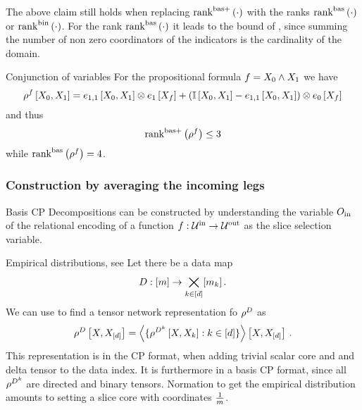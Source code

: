 The above claim still holds when replacing $\mathrm{rank}^{\mathrm{bas+}}\left(\cdot\right)$ with the ranks $\mathrm{rank}^{\mathrm{bas}}\left(\cdot\right)$ or $\mathrm{rank}^{\mathrm{bin}}\left(\cdot\right)$.
For the rank $\mathrm{rank}^{\mathrm{bas}}\left(\cdot\right)$ it leads to the bound of , since summing the number of non zero coordinators of the indicators is the cardinality of the domain.

\begin{example}{Conjunction of variables}
	For the propositional formula $f = X_{0} \land X_{1}$ we have
		\[ \rho^{f}\left[X_{0},X_{1}\right]
		 = e_{1,1}\left[X_{0},X_{1}\right] \otimes e_{1}\left[X_{f}\right]
		  +  (\mathbb{I}\left[X_{0},X_{1}\right] - e_{1,1}\left[X_{0},X_{1}\right]) \otimes e_{0}\left[X_{f}\right]  \]
	and thus 
		\[ \mathrm{rank}^{\mathrm{bas+}}\left(\rho^{f}\right) \leq 3\]
	while $\mathrm{rank}^{\mathrm{bas}}\left(\rho^{f}\right) = 4$.
\end{example}




\subsubsection{Construction by averaging the incoming legs}

Basis CP Decompositions can be constructed by understanding the variable $O_{\mathrm{in}}$ of the relational encoding of a function $f:\mathcal{U}^{\mathrm{in}} \rightarrow \mathcal{U}^{\mathrm{out}}$ as the slice selection variable.

\begin{example}{Empirical distributions, see }
	Let there be a data map 
		\[ D : [m] \rightarrow \bigtimes_{k\in[d]}[m_{k}] \, . \]
	We can use  to find a tensor network representation fo $\rho^{D}$ as
	\begin{align*}
		\rho^{D}\left[X,X_{[d]}\right]  
		= \left\langle 
		\{\rho^{D^{k}}\left[X,X_{k}\right] : k\in[d] \} 
		\right\rangle \left[ X,X_{[d]} \right] \, . 
	\end{align*}
	This representation is in the CP format, when adding trivial scalar core and and delta tensor to the data index.
	It is furthermore in a basis CP format, since all $\rho^{D^{k}}$ are directed and binary tensors.
	Normation to get the empirical distribution amounts to setting a slice core with coordinates $\frac{1}{m}$.
\end{example}





